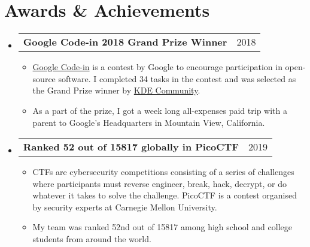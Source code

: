 \documentclass[letterpaper,11pt]{article}
\makeatletter
\newcommand{\sresumeItem}[1]{
  \item\small{
    { #1 \vspace{-2pt}}
  }
}
\newcommand{\shortResumeSubheading}[2]{
  \vspace{-1pt}\item
    \begin{tabular*}{0.97\textwidth}[t]{l@{\extracolsep{\fill}}r}
      \textbf{#1} & #2 \\
    \end{tabular*}
  \vspace{-5pt}
}
\newcommand{\resumeSubHeadingListStart}{\begin{itemize}[leftmargin=*]}
\newcommand{\resumeSubHeadingListEnd}{\end{itemize}}
\newcommand{\resumeItemListStart}{\begin{itemize}}
\newcommand{\resumeItemListEnd}{\end{itemize}\vspace{-5pt}}
\makeatother
\begin{document}
\section{Awards \& Achievements}
  \resumeSubHeadingListStart

    \shortResumeSubheading
      {Google Code-in 2018 Grand Prize Winner}{2018}
      \resumeItemListStart
        \sresumeItem
          {\href{http://g.co/gci/}{Google Code-in} is a contest by Google to encourage participation in open-source software. I completed 34 tasks in the contest and was selected as the Grand Prize winner by \href{https://kde.org/}{KDE Community}.}
        \sresumeItem
          {As a part of the prize, I got a week long all-expenses paid trip with a parent to Google's Headquarters in Mountain View, California.}
      \resumeItemListEnd

    \shortResumeSubheading
      {Ranked 52 out of 15817 globally in PicoCTF}{2019}
      \resumeItemListStart
        \sresumeItem
          {CTFs are cybersecurity competitions consisting of a series of challenges where participants must reverse engineer, break, hack, decrypt, or do whatever it takes to solve the challenge. PicoCTF is a contest organised by security experts at Carnegie Mellon University.}
        \sresumeItem
          {My team was ranked 52nd out of 15817 among high school and college students from around the world.}
      \resumeItemListEnd

  \resumeSubHeadingListEnd

\end{document}
